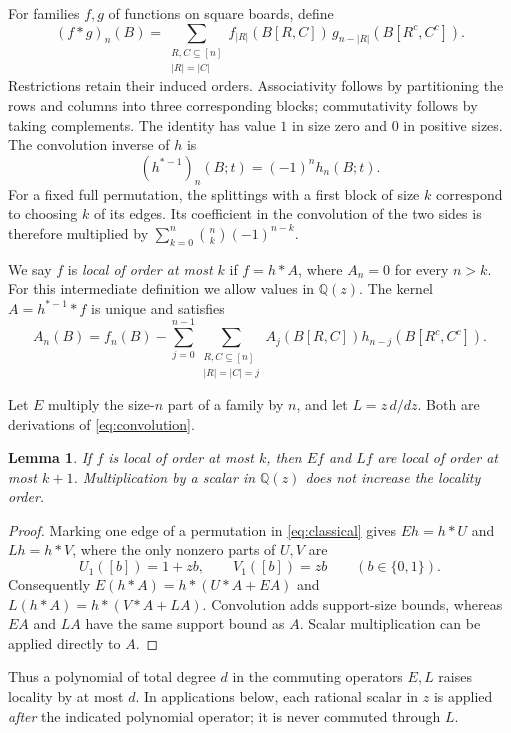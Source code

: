 \documentclass[11pt]{article}
\newtheorem{lemma}[theorem]{Lemma}
\newcommand{\QQ}{\mathbb Q}
\newcommand{\invh}{h^{*-1}}
\begin{document}
For families $f,g$ of functions on square boards, define
\begin{equation}\label{eq:convolution}
 (f*g)_n(B)=
 \sum_{\substack{R,C\subseteq[n]\\|R|=|C|}}
 f_{|R|}(B[R,C])\,g_{n-|R|}(B[R^c,C^c]).
\end{equation}
Restrictions retain their induced orders. Associativity follows by
partitioning the rows and columns into three corresponding blocks;
commutativity follows by taking complements. The identity has value $1$
in size zero and $0$ in positive sizes. The convolution inverse of $h$ is
\begin{equation}\label{eq:inverse}
 (\invh)_n(B;t)=(-1)^n h_n(B;t).
\end{equation}
For a fixed full permutation, the splittings with a first block of size
$k$ correspond to choosing $k$ of its edges. Its coefficient in the
convolution of the two sides is therefore multiplied by
$\sum_{k=0}^{n}\binom nk(-1)^{n-k}$.

We say $f$ is \emph{local of order at most $k$} if $f=h*A$, where
$A_n=0$ for every $n>k$. For this intermediate definition we allow values
in $\QQ(z)$. The kernel $A=\invh*f$ is unique and satisfies
\begin{equation}\label{eq:recursion}
 A_n(B)=f_n(B)-\sum_{j=0}^{n-1}
 \sum_{\substack{R,C\subseteq[n]\\|R|=|C|=j}}
 A_j(B[R,C])h_{n-j}(B[R^c,C^c]).
\end{equation}

Let $E$ multiply the size-$n$ part of a family by $n$, and let
$L=z\,d/dz$. Both are derivations of \eqref{eq:convolution}.

\begin{lemma}\label{lem:operators}
If $f$ is local of order at most $k$, then $Ef$ and $Lf$ are local of
order at most $k+1$. Multiplication by a scalar in $\QQ(z)$ does not
increase the locality order.
\end{lemma}
\begin{proof}
Marking one edge of a permutation in \eqref{eq:classical} gives
$Eh=h*U$ and $Lh=h*V$, where the only nonzero parts of $U,V$ are
\[
 U_1([b])=1+zb,\qquad V_1([b])=zb\qquad(b\in\{0,1\}).
\]
Consequently $E(h*A)=h*(U*A+EA)$ and
$L(h*A)=h*(V*A+LA)$. Convolution adds support-size bounds, whereas $EA$
and $LA$ have the same support bound as $A$. Scalar multiplication can
be applied directly to $A$.
\end{proof}

Thus a polynomial of total degree $d$ in the commuting operators $E,L$
raises locality by at most $d$. In applications below, each rational
scalar in $z$ is applied \emph{after} the indicated polynomial operator;
it is never commuted through $L$.
\end{document}
